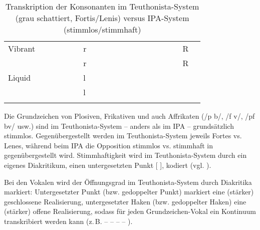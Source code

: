 \begin{table}
\begin{tabular}{llllllllllllllllllrc}
 Vibrant & \multicolumn{2}{c}{} & \multicolumn{2}{c}{} &  & \cellcolor{lsLightGray}r & \multicolumn{3}{c}{} &  & \multicolumn{3}{c}{} & \multicolumn{3}{c}{} & \multicolumn{1}{c}{} & \cellcolor{lsLightGray}R & \\
         &  &  &  &  &  & r &  &  &  &  &  &  &  &  &  &  & \multicolumn{1}{c}{} & R & \\
 Liquid & \multicolumn{2}{c}{} & \multicolumn{2}{c}{} &  & \cellcolor{lsLightGray}l & \multicolumn{3}{c}{} &  & \multicolumn{3}{c}{} & \multicolumn{3}{c}{} & \multicolumn{2}{c}{} & \\
        &  &  &  &  &  & l &  &  &  &  &  &  &  &  &  &  &  &  & \\
\lspbottomrule
\end{tabular}
\caption{Transkription der Konsonanten im Teuthonista-System (grau schattiert, Fortis/Lenis) versus IPA-System (stimmlos/stimmhaft)\label{tab:1}}
\end{table}

Die Grundzeichen von Plosiven, Frikativen und auch Affrikaten (/p b/, /f v/, /pf bv/ usw.) sind im Teuthonista-System -- anders als im IPA -- grundsätzlich stimmlos. Gegenübergestellt werden im Teuthonista-System jeweils Fortes vs. Lenes, während beim IPA die Opposition stimmlos vs. stimmhaft in   gegenübergestellt wird. Stimmhaftigkeit wird im Teuthonista-System durch ein eigenes Diakritikum, einen untergesetzten Punkt [ ], kodiert (vgl. ).

Bei den Vokalen wird der Öffnungsgrad im Teuthonista-System durch Diakritika markiert: Untergesetzter Punkt (bzw. gedoppelter Punkt) markiert eine (stärker) geschlossene Realisierung, untergesetzter Haken (bzw. gedoppelter Haken) eine (stärker) offene Realisierung, sodass für jeden Grundzeichen-Vokal ein Kontinuum transkribiert werden kann (z.\,B.  –  –  –  – ).

